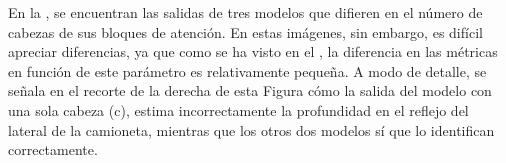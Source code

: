 En la , se encuentran las salidas de tres modelos que difieren en el número de cabezas de sus bloques de atención. En estas imágenes, sin embargo, es difícil apreciar diferencias, ya que como se ha visto en el , la diferencia en las métricas en función de este parámetro es relativamente pequeña. A modo de detalle, se señala en el recorte de la derecha de esta Figura cómo la salida del modelo con una sola cabeza (c), estima incorrectamente la profundidad en el reflejo del lateral de la camioneta, mientras que los otros dos modelos sí que lo identifican correctamente.






\captionsetup[subfigure]{labelformat=empty}
    \begin{figure}[!ht]
\centering

\hspace{-3mm}

\vspace{-3.5mm}

\hspace{-3mm}
    

\end{figure}
